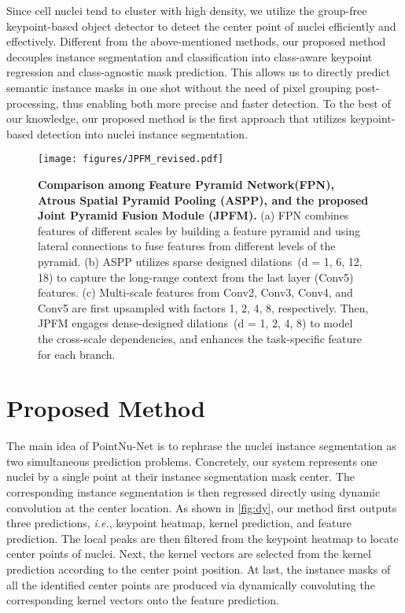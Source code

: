 \documentclass[lettersize,journal]{IEEEtran}
\newcommand{\ie}{{\textit{i.e.}}, }
\begin{document}
Since cell nuclei tend to cluster with high density, we utilize the group-free keypoint-based object detector to detect the center point of nuclei efficiently and effectively. Different from the above-mentioned methods, our proposed method decouples instance segmentation and classification into class-aware keypoint regression and class-agnostic mask prediction. This allows us to directly predict semantic instance masks in one shot without the need of pixel grouping post-processing, thus enabling both more precise and faster detection. To the best of our knowledge, our proposed method is the first approach that utilizes keypoint-based detection into nuclei instance segmentation.  

\begin{figure*}[t]
\centering
\texttt{[image: figures/JPFM\_revised.pdf]}
\caption{\textbf{Comparison among Feature Pyramid Network(FPN), Atrous Spatial Pyramid Pooling (ASPP), and the proposed Joint Pyramid Fusion Module (JPFM).} (a) FPN combines features of different scales by building a feature pyramid and using lateral connections to fuse features from different levels of the pyramid. (b) ASPP utilizes sparse designed dilations~(d = 1, 6, 12, 18) to capture the long-range context from the last layer (Conv5) features.
(c) Multi-scale features from Conv2, Conv3, Conv4, and Conv5 are first upsampled with factors 1, 2, 4, 8, respectively.
Then, JPFM engages dense-designed dilations~(d = 1, 2, 4, 8) to model the cross-scale dependencies, and enhances the task-specific feature for each branch.
}
\label{fig:jpfm}
\end{figure*}

\section{Proposed Method}
The main idea of PointNu-Net is to rephrase the nuclei instance segmentation as two simultaneous prediction problems. Concretely, our system represents one nuclei by a single point at their instance segmentation mask center. The corresponding instance segmentation is then regressed directly using dynamic convolution at the center location. As shown in \autoref{fig:dy}, our method first outputs three predictions, \ie keypoint heatmap, kernel prediction, and feature prediction. The local peaks are then filtered from the keypoint heatmap to locate center points of nuclei. Next, the kernel vectors are selected from the kernel prediction according to the center point position. At last, the instance masks of all the identified center points are produced via dynamically convoluting the corresponding kernel vectors onto the feature prediction.
\end{document}
